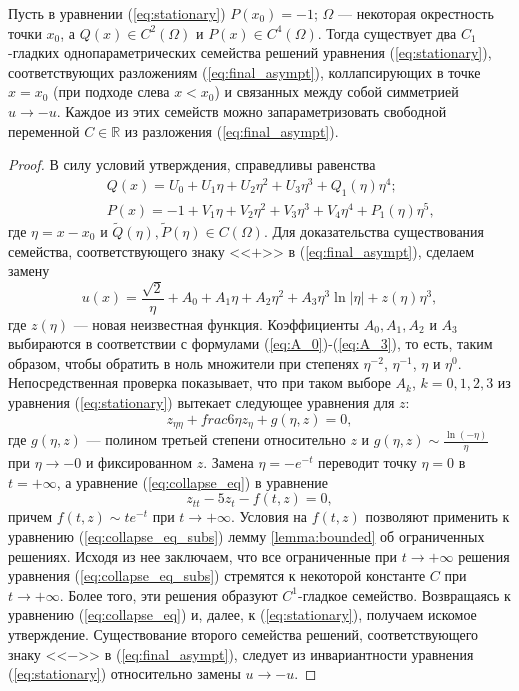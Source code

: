 \begin{proposition}
Пусть в уравнении (\ref{eq:stationary}) $P(x_0) = -1$; $\Omega$ --- некоторая окрестность точки $x_0$, а $Q(x) \in C^2(\Omega)$ и $P(x) \in C^4(\Omega)$.
Тогда существует два $C_1$-гладких однопараметрических семейства решений уравнения (\ref{eq:stationary}), соответствующих разложениям (\ref{eq:final_asympt}), коллапсирующих в точке $x = x_0$ (при подходе слева $x < x_0$) и связанных между собой симметрией $u \to -u$.
Каждое из этих семейств можно запараметризовать свободной переменной $C \in \mathbb{R}$ из разложения (\ref{eq:final_asympt}).
\end{proposition}
%
\begin{proof}
В силу условий утверждения, справедливы равенства
%
\begin{eqnarray}
&& Q(x) = U_0 + U_1 \eta + U_2 \eta^2 + U_3 \eta^3 + Q_1(\eta)\eta^4; \\
&& P(x) = -1 + V_1 \eta+ V_2 \eta^2 + V_3 \eta^3 + V_4 \eta^4 + P_1(\eta)\eta^5,
\end{eqnarray}
%
где $\eta = x - x_0$ и $\widetilde{Q}(\eta), \widetilde{P}(\eta) \in C(\Omega)$.
Для доказательства существования семейства, соответствующего знаку <<$+$>> в (\ref{eq:final_asympt}), сделаем замену
%
\begin{equation}
u(x) = \frac{\sqrt{2}}\eta + A_0 + A_1 \eta + A_2 \eta^2 + A_3 \eta^3 \ln|\eta| + z(\eta)\eta^3,
\end{equation}
%
где $z(\eta)$ --- новая неизвестная функция.
Коэффициенты $A_0, A_1, A_2$ и $A_3$ выбираются в соответствии с формулами (\ref{eq:A_0})-(\ref{eq:A_3}), то есть, таким образом, чтобы обратить в ноль множители при степенях $\eta^{-2}$, $\eta^{-1}$, $\eta$ и $\eta^0$.
Непосредственная проверка показывает, что при таком выборе $A_k$, $k = 0,1,2,3$ из уравнения (\ref{eq:stationary}) вытекает следующее уравнения для $z$:
%
\begin{equation}
z_{\eta\eta} + frac{6}{\eta} z_\eta + g(\eta, z) = 0,
\label{eq:collapse_eq}
\end{equation}
%
где $g(\eta, z)$ --- полином третьей степени относительно $z$ и $g(\eta, z) \sim \frac{\ln(-\eta)}{\eta}$ при $\eta \to -0$ и фиксированном $z$.
Замена $\eta = -e^{-t}$ переводит точку $\eta = 0$ в $t = +\infty$, а уравнение (\ref{eq:collapse_eq}) в уравнение
%
\begin{equation}
z_{tt} - 5z_t - f(t,z) = 0,
\label{eq:collapse_eq_subs}
\end{equation}
%
причем $f(t,z) \sim te^{-t}$ при $t \to +\infty$.
Условия на $f(t,z)$ позволяют применить к уравнению (\ref{eq:collapse_eq_subs}) лемму \ref{lemma:bounded} об ограниченных решениях.
Исходя из нее заключаем, что все ограниченные при $t \to +\infty$ решения уравнения (\ref{eq:collapse_eq_subs}) стремятся к некоторой константе $C$ при $t \to +\infty$.
Более того, эти решения образуют $C^1$-гладкое семейство.
Возвращаясь к уравнению (\ref{eq:collapse_eq}) и, далее, к (\ref{eq:stationary}), получаем искомое утверждение.
Существование второго семейства решений, соответствующего знаку <<$-$>> в (\ref{eq:final_asympt}), следует из инвариантности уравнения (\ref{eq:stationary}) относительно замены $u \to -u$.
\end{proof}

